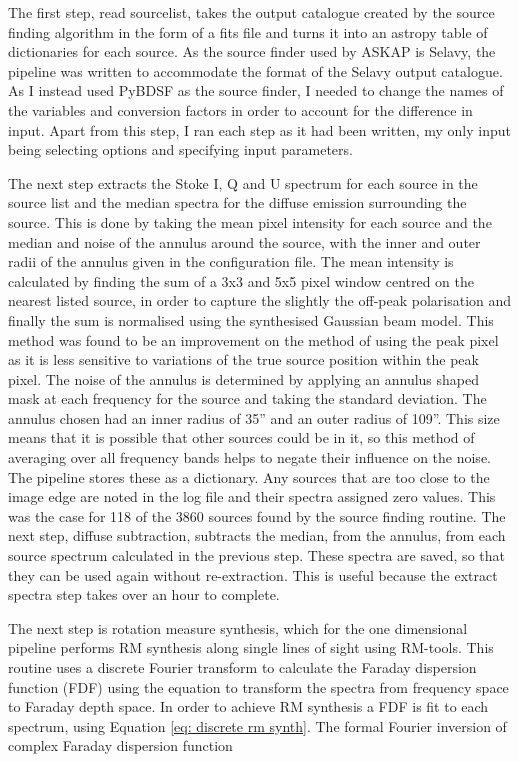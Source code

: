 The first step, read sourcelist, takes the output catalogue created by the source finding algorithm in the form of a fits file and turns it into an astropy table of dictionaries for each source. As the source finder used by ASKAP is Selavy, the pipeline was written to accommodate the format of the Selavy output catalogue. As I instead used PyBDSF as the source finder, I needed to change the names of the variables and conversion factors in order to account for the difference in input. Apart from this step, I ran each step as it had been written, my only input being selecting options and specifying input parameters.

The next step extracts the Stoke I, Q and U spectrum for each source in the source list and the median spectra for the diffuse emission surrounding the source. This is done by taking the mean pixel intensity for each source and the median and noise of the annulus around the source, with the inner and outer radii of the annulus given in the configuration file. The mean intensity is calculated by finding the sum of a 3x3 and 5x5 pixel window centred on the nearest listed source, in order to capture the slightly the off-peak polarisation and finally the sum is normalised using the synthesised Gaussian beam model. This method was found to be an improvement on the method of using the peak pixel as it is less sensitive to variations of the true source position within the peak pixel. The noise of the annulus is determined by applying an annulus shaped mask at each frequency for the source and taking the standard deviation. The annulus chosen had an inner radius of 35'' and an outer radius of 109''. This size means that it is possible that other sources could be in it, so this method of averaging over all frequency bands helps to negate their influence on the noise. The pipeline stores these as a dictionary. Any sources that are too close to the image edge are noted in the log file and their spectra assigned zero values. This was the case for 118 of the 3860 sources found by the source finding routine. The next step, diffuse subtraction, subtracts the median, from the annulus, from each source spectrum calculated in the previous step. These spectra are saved, so that they can be used again without re-extraction. This is useful because the extract spectra step takes over an hour to complete.

The next step is rotation measure synthesis, which for the one dimensional pipeline performs RM synthesis along single lines of sight using RM-tools. 
This routine uses a discrete Fourier transform to calculate the Faraday dispersion function (FDF) using the equation to transform the spectra from frequency space to Faraday depth space. In order to achieve RM synthesis a FDF is fit to each spectrum, using Equation \ref{eq: discrete rm synth}. The formal Fourier inversion of complex Faraday dispersion function

